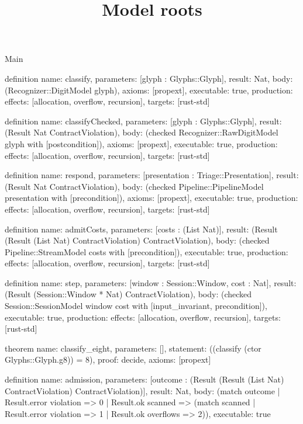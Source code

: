 \begin{lexlean}{Main}
\title{Model roots}
\begin{semanticmodule}
definition{
  name: classify,
  parameters: [glyph : Glyphs::Glyph],
  result: Nat,
  body: (Recognizer::DigitModel glyph),
  axioms: [propext],
  executable: true,
  production: {effects: [allocation, overflow, recursion], targets: [rust-std]}
}

definition{
  name: classifyChecked,
  parameters: [glyph : Glyphs::Glyph],
  result: (Result Nat ContractViolation),
  body: (checked Recognizer::RawDigitModel glyph with [postcondition]),
  axioms: [propext],
  executable: true,
  production: {effects: [allocation, overflow, recursion], targets: [rust-std]}
}

definition{
  name: respond,
  parameters: [presentation : Triage::Presentation],
  result: (Result Nat ContractViolation),
  body: (checked Pipeline::PipelineModel presentation with [precondition]),
  axioms: [propext],
  executable: true,
  production: {effects: [allocation, overflow, recursion], targets: [rust-std]}
}

definition{
  name: admitCosts,
  parameters: [costs : (List Nat)],
  result: (Result (Result (List Nat) ContractViolation) ContractViolation),
  body: (checked Pipeline::StreamModel costs with [precondition]),
  executable: true,
  production: {effects: [allocation, overflow, recursion], targets: [rust-std]}
}

definition{
  name: step,
  parameters: [window : Session::Window, cost : Nat],
  result: (Result (Session::Window * Nat) ContractViolation),
  body: (checked Session::SessionModel window cost with [input_invariant, precondition]),
  executable: true,
  production: {effects: [allocation, overflow, recursion], targets: [rust-std]}
}

theorem{
  name: classify_eight,
  parameters: [],
  statement: ((classify (ctor Glyphs::Glyph.g8)) = 8),
  proof: decide{},
  axioms: [propext]
}

definition{
  name: admission,
  parameters: [outcome : (Result (Result (List Nat) ContractViolation) ContractViolation)],
  result: Nat,
  body: (match outcome
    | Result.error violation => 0
    | Result.ok scanned => (match scanned
      | Result.error violation => 1
      | Result.ok overflows => 2)),
  executable: true
}


\end{semanticmodule}
\end{lexlean}
